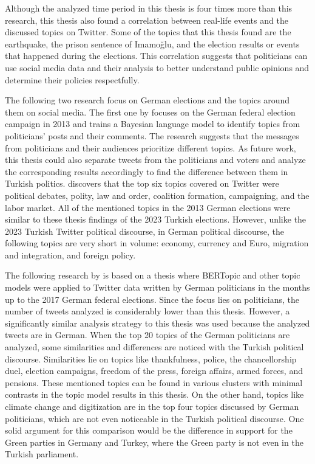 Although the analyzed time period in this thesis is four times more than this research, this thesis 
also found a correlation between real-life events and the discussed topics on Twitter. Some of the 
topics that this thesis found are the earthquake, the prison sentence of Imamoğlu, and the election 
results or events that happened during the elections. This correlation suggests that politicians 
can use social media data and their analysis to better understand public opinions and determine 
their policies respectfully.

The following two research focus on German elections and the topics around them on social media. 
The first one by \textcite{stier_germany_election_2018} focuses on the German federal election 
campaign in 2013 and trains a Bayesian language model to identify topics from politicians' posts 
and their comments. The research suggests that the messages from politicians and their audiences 
prioritize different topics. As future work, this thesis could also separate tweets from the 
politicians and voters and analyze the corresponding results accordingly to find the difference 
between them in Turkish politics. \textcite{stier_germany_election_2018} discovers that the top six 
topics covered on Twitter were political debates, polity, law and order, coalition formation, 
campaigning, and the labor market. All of the mentioned topics in the 2013 German elections were 
similar to these thesis findings of the 2023 Turkish elections. However, unlike the 2023 Turkish 
Twitter political discourse, in German political discourse, the following topics are very short in 
volume: economy, currency and Euro, migration and integration, and foreign policy. 

The following research by \textcite{bertopic_twitter_german_politics_2022} is based on a thesis where 
BERTopic and other topic models were applied to Twitter data written by German politicians in the 
months up to the 2017 German federal elections. Since the focus lies on politicians, the number of 
tweets analyzed is considerably lower than this thesis. However, a significantly similar analysis 
strategy to this thesis was used because the analyzed tweets are in German. When the top 20 topics 
of the German politicians are analyzed, some similarities and differences are noticed with the 
Turkish political discourse. Similarities lie on topics like thankfulness, police, the chancellorship 
duel, election campaigns, freedom of the press, foreign affairs, armed forces, and pensions. 
These mentioned topics can be found in various clusters with minimal contrasts in the topic model 
results in this thesis. On the other hand, topics like climate change and digitization are in 
the top four topics discussed by German politicians, which are not even noticeable in the Turkish 
political discourse. One solid argument for this comparison would be the difference in support for 
the Green parties in Germany and Turkey, where the Green party is not even in the Turkish parliament. 

